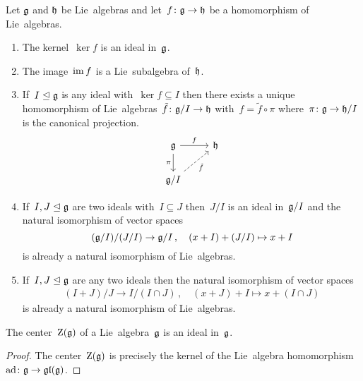 \begin{proposition}
  Let $\mathfrak{g}$ and $\mathfrak{h}$ be Lie~algebras and let~$f \colon \mathfrak{g} \to \mathfrak{h}$ be a homomorphism of Lie~algebras.
  \begin{enumerate}
    \item
      The kernel~$\ker f$ is an ideal in~$\mathfrak{g}$.
    \item
      The image~$\operatorname{im} f$ is a Lie~subalgebra of~$\mathfrak{h}$.
    \item
      If~$I \trianglelefteq \mathfrak{g}$ is any ideal with~$\ker f \subseteq I$ then there exists a unique homomorphism of Lie~algebras~$\tilde{f} \colon \mathfrak{g}/I \to \mathfrak{h}$ with~$f = \tilde{f} \circ \pi$ where~$\pi \colon \mathfrak{g} \to \mathfrak{h}/I$ is the canonical projection.
      \[
        \begin{tikzcd}
          \glie
          \arrow{r}[above]{f}
          \arrow{d}[left]{\pi}
          &
          \hlie
          \\
          \glie/I
          \arrow[dashed]{ur}[below right]{\tilde{f}}
          &
          {}
        \end{tikzcd}
      \]
    \item
      If~$I, J \trianglelefteq \mathfrak{g}$ are two ideals with~$I \subseteq J$ then~$J/I$ is an ideal in~$\mathfrak{g}/I$ and the natural isomorphism of vector spaces
      \[
        (\mathfrak{g}/I) / (J/I)
        \to
        \mathfrak{g}/I \,,
        \quad
        (x+I) + (J/I)
        \mapsto
        x+I
      \]
      is already a natural isomorphism of Lie~algebras.
    \item
      If~$I, J \trianglelefteq \mathfrak{g}$ are any two ideals then the natural isomorphism of vector spaces
      \begin{gather*}
        (I + J)/J
        \to
        I/(I \cap J)  \,,
        \quad
        (x+J)+I
        \mapsto
        x + (I \cap J)
      \end{gather*}
      is already a natural isomorphism of Lie~algebras.
  \end{enumerate}
\end{proposition}


\begin{corollary}
  The center~$\operatorname{Z}(\mathfrak{g})$ of a Lie~algebra~$\mathfrak{g}$ is an ideal in~$\mathfrak{g}$.
\end{corollary}


\begin{proof}
  The center~$\operatorname{Z}(\mathfrak{g})$ is precisely the kernel of the Lie~algebra homomorphism~$\operatorname{ad} \colon \mathfrak{g} \to \mathfrak{gl}(\mathfrak{g})$.
\end{proof}



